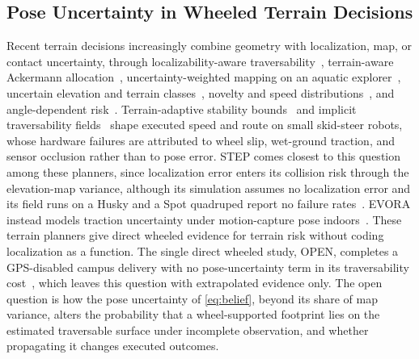 \subsection{Pose Uncertainty in Wheeled Terrain Decisions}
Recent terrain decisions increasingly combine geometry with localization, map, or contact uncertainty, through localizability-aware traversability~\cite{P_E13}, terrain-aware Ackermann allocation~\cite{P_F09}, uncertainty-weighted mapping on an aquatic explorer~\cite{P_F10}, uncertain elevation and terrain classes~\cite{P_S46,P_R08}, novelty and speed distributions~\cite{P_S42}, and angle-dependent risk~\cite{P_S45}. Terrain-adaptive stability bounds~\cite{P_R13} and implicit traversability fields~\cite{P_R15} shape executed speed and route on small skid-steer robots, whose hardware failures are attributed to wheel slip, wet-ground traction, and sensor occlusion rather than to pose error. STEP comes closest to this question among these planners, since localization error enters its collision risk through the elevation-map variance, although its simulation assumes no localization error and its field runs on a Husky and a Spot quadruped report no failure rates~\cite{P_K03}. EVORA instead models traction uncertainty under motion-capture pose indoors~\cite{P_K05}. These terrain planners give direct wheeled evidence for terrain risk without coding localization as a function. The single direct wheeled study, OPEN, completes a GPS-disabled campus delivery with no pose-uncertainty term in its traversability cost~\cite{P_M10}, which leaves this question with extrapolated evidence only. The open question is how the pose uncertainty of \eqref{eq:belief}, beyond its share of map variance, alters the probability that a wheel-supported footprint lies on the estimated traversable surface under incomplete observation, and whether propagating it changes executed outcomes.

